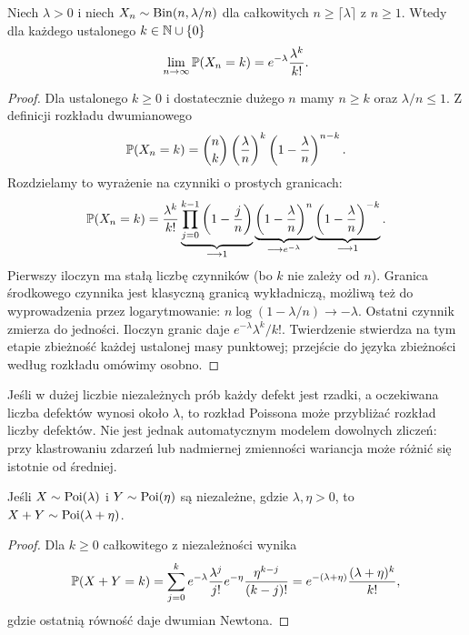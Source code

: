 \begin{twierdzenie}
Niech $\lambda>0$ i niech $X_n\sim\operatorname{Bin}(n,\lambda/n)$
dla całkowitych $n\geq\lceil\lambda\rceil$ z $n\geq1$.
Wtedy dla każdego ustalonego $k\in\mathbb{N}\cup\{0\}$
\[
\lim_{n\to\infty}\mathbb{P}(X_n=k)
=e^{-\lambda}\frac{\lambda^k}{k!}.
\]
\end{twierdzenie}
\begin{proof}
Dla ustalonego $k\geq0$ i dostatecznie dużego $n$
mamy $n\geq k$ oraz $\lambda/n\leq1$. Z definicji
rozkładu dwumianowego
\[
\mathbb{P}(X_n=k)=\binom nk\left(\frac\lambda n\right)^k
\left(1-\frac\lambda n\right)^{n-k}.
\]
Rozdzielamy to wyrażenie na czynniki o prostych granicach:
\[
\mathbb{P}(X_n=k)=\frac{\lambda^k}{k!}
\underbrace{\prod_{j=0}^{k-1}\left(1-\frac jn\right)}_{\longrightarrow1}
\underbrace{\left(1-\frac\lambda n\right)^n}_{\longrightarrow e^{-\lambda}}
\underbrace{\left(1-\frac\lambda n\right)^{-k}}_{\longrightarrow1}.
\]
Pierwszy iloczyn ma stałą liczbę czynników (bo $k$ nie
zależy od $n$). Granica środkowego czynnika jest
klasyczną granicą wykładniczą, możliwą też do
wyprowadzenia przez logarytmowanie:
$n\log(1-\lambda/n)\to-\lambda$.
Ostatni czynnik zmierza do jedności.
Iloczyn granic daje $e^{-\lambda}\lambda^k/k!$.
Twierdzenie stwierdza na tym etapie zbieżność
każdej ustalonej masy punktowej; przejście do
języka zbieżności według rozkładu omówimy osobno.
\end{proof}

\begin{przyklad}
Jeśli w dużej liczbie niezależnych prób każdy defekt jest rzadki,
a oczekiwana liczba defektów wynosi około $\lambda$, to rozkład
Poissona może przybliżać rozkład liczby defektów.
Nie jest jednak automatycznym modelem dowolnych zliczeń:
przy klastrowaniu zdarzeń lub nadmiernej zmienności
wariancja może różnić się istotnie od średniej.
\end{przyklad}

\begin{stwierdzenie}
Jeśli $X\sim\operatorname{Poi}(\lambda)$ i $Y\sim\operatorname{Poi}(\eta)$ są niezależne,
gdzie $\lambda,\eta>0$, to $X+Y\sim\operatorname{Poi}(\lambda+\eta)$.
\end{stwierdzenie}
\begin{proof}
Dla $k\geq0$ całkowitego z niezależności wynika
\[
\mathbb{P}(X+Y=k)
=\sum_{j=0}^k e^{-\lambda}\frac{\lambda^j}{j!}
 e^{-\eta}\frac{\eta^{k-j}}{(k-j)!}
=e^{-(\lambda+\eta)}\frac{(\lambda+\eta)^k}{k!},
\]
gdzie ostatnią równość daje dwumian Newtona.
\end{proof}

